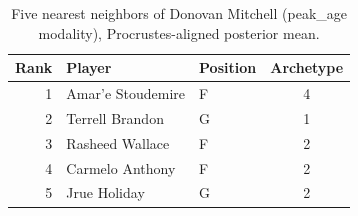 \begin{table}[htbp]
  \centering\small
  \begin{tabular}{rllc}
    \toprule
    Rank & Player & Position & Archetype \\
    \midrule
    1 & Amar'e Stoudemire & F & 4 \\
    2 & Terrell Brandon & G & 1 \\
    3 & Rasheed Wallace & F & 2 \\
    4 & Carmelo Anthony & F & 2 \\
    5 & Jrue Holiday & G & 2 \\
    \bottomrule
  \end{tabular}
  \caption{Five nearest neighbors of Donovan Mitchell (peak_age modality), Procrustes-aligned posterior mean.}
  \label{tab:Donovan_Mitchell_neighbors_peak_age}
\end{table}

